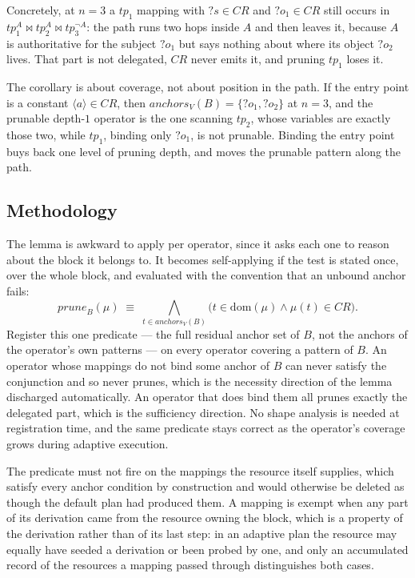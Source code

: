 \documentclass{article}
\begin{document}
Concretely, at $n = 3$ a $tp_1$ mapping with $?s \in CR$ and $?o_1 \in CR$ still occurs
in $tp_1^{A} \bowtie tp_2^{A} \bowtie tp_3^{\lnot A}$: the path runs two hops inside $A$
and then leaves it, because $A$ is authoritative for the subject $?o_1$ but says nothing
about where its object $?o_2$ lives. That part is not delegated, $CR$ never emits it, and
pruning $tp_1$ loses it.

The corollary is about coverage, not about position in the path. If the entry point is a
constant $\langle a \rangle \in CR$, then $\mathit{anchors}_V(B) = \{?o_1, ?o_2\}$ at
$n = 3$, and the prunable depth-$1$ operator is the one scanning $tp_2$, whose variables
are exactly those two, while $tp_1$, binding only $?o_1$, is not prunable. Binding the
entry point buys back one level of pruning depth, and moves the prunable pattern along
the path.

\subsection*{Methodology}

The lemma is awkward to apply per operator, since it asks each one to reason about the
block it belongs to. It becomes self-applying if the test is stated once, over the whole
block, and evaluated with the convention that an unbound anchor fails:
\[
\mathit{prune}_B(\mu) \;\equiv\; \bigwedge_{t \in \mathit{anchors}_V(B)}
\bigl( t \in \mathrm{dom}(\mu) \wedge \mu(t) \in CR \bigr).
\]
Register this one predicate --- the full residual anchor set of $B$, not the anchors of
the operator's own patterns --- on every operator covering a pattern of $B$. An operator
whose mappings do not bind some anchor of $B$ can never satisfy the conjunction and so
never prunes, which is the necessity direction of the lemma discharged automatically. An
operator that does bind them all prunes exactly the delegated part, which is the
sufficiency direction. No shape analysis is needed at registration time, and the same
predicate stays correct as the operator's coverage grows during adaptive execution.

The predicate must not fire on the mappings the resource itself supplies, which satisfy
every anchor condition by construction and would otherwise be deleted as though the
default plan had produced them. A mapping is exempt when any part of its derivation came
from the resource owning the block, which is a property of the derivation rather than of
its last step: in an adaptive plan the resource may equally have seeded a derivation or
been probed by one, and only an accumulated record of the resources a mapping passed
through distinguishes both cases.
\end{document}
